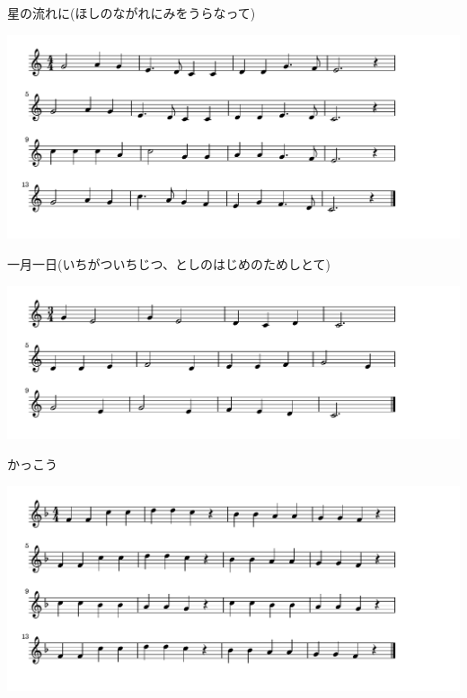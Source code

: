 \documentclass[a4paper]{ltjsarticle}
\begin{document}
\vspace{-10mm} \hspace{10mm}
星の流れに(ほしのながれにみをうらなって)



\includegraphics[clip]{ichigatsuichijitsu_crop.pdf}

\vspace{-10mm} \hspace{10mm}
一月一日(いちがついちじつ、としのはじめのためしとて)



\includegraphics[clip]{kakkou_crop.pdf}

\vspace{-10mm} \hspace{10mm}
かっこう



\includegraphics[clip]{kirakira_crop.pdf}
\end{document}

